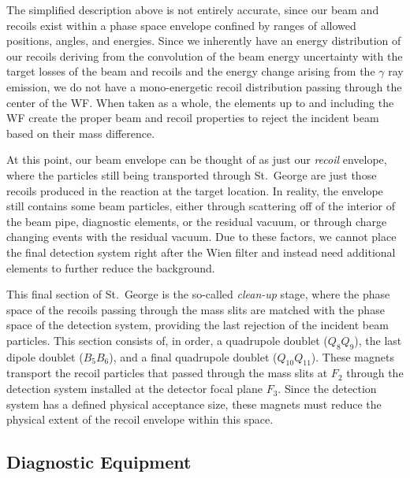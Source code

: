 The simplified description above is not entirely accurate, since our
beam and recoils exist within a phase space envelope confined by ranges
of allowed positions, angles, and energies. Since we inherently have an
energy distribution of our recoils deriving from the convolution of the
beam energy uncertainty with the target losses of the beam and recoils
and the energy change arising from the $\gamma$ ray emission, we do not
have a mono-energetic recoil distribution passing through the center of
the WF. When taken as a whole, the elements up to and including the WF
create the proper beam and recoil properties to reject the incident beam
based on their mass difference.

At this point, our beam envelope can be thought of as just our
\textit{recoil} envelope, where the particles still being transported
through St.\ George are just those recoils produced in the reaction at
the target location. In reality, the envelope still contains some beam
particles, either through scattering off of the interior of the beam
pipe, diagnostic elements, or the residual vacuum, or through charge
changing events with the residual vacuum. Due to these factors, we
cannot place the final detection system right after the Wien filter and
instead need additional elements to further reduce the background.

This final section of St.\ George is the so-called \textit{clean-up}
stage, where the phase space of the recoils passing through the mass
slits are matched with the phase space of the detection system,
providing the last rejection of the incident beam particles. This
section consists of, in order, a quadrupole doublet ($Q_8Q_9$), the last
dipole doublet ($B_5B_6$), and a final quadrupole doublet
($Q_{10}Q_{11}$). These magnets transport the recoil particles that
passed through the mass slits at $F_2$ through the detection system
installed at the detector focal plane $F_3$. Since the detection system
has a defined physical acceptance size, these magnets must reduce the
physical extent of the recoil envelope within this space.


\subsection{Diagnostic Equipment}
\label{sec:diagnostic}

